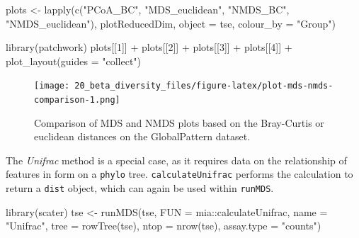 \documentclass[
]{book}
\newenvironment{Shaded}{\begin{snugshade}}{\end{snugshade}}
\newcommand{\AttributeTok}[1]{\textcolor[rgb]{0.77,0.63,0.00}{#1}}
\newcommand{\DecValTok}[1]{\textcolor[rgb]{0.00,0.00,0.81}{#1}}
\newcommand{\FunctionTok}[1]{\textcolor[rgb]{0.00,0.00,0.00}{#1}}
\newcommand{\NormalTok}[1]{#1}
\newcommand{\OtherTok}[1]{\textcolor[rgb]{0.56,0.35,0.01}{#1}}
\newcommand{\SpecialCharTok}[1]{\textcolor[rgb]{0.00,0.00,0.00}{#1}}
\newcommand{\StringTok}[1]{\textcolor[rgb]{0.31,0.60,0.02}{#1}}
\begin{document}
\begin{Shaded}
\begin{Highlighting}[]
\NormalTok{plots }\OtherTok{\textless{}{-}} \FunctionTok{lapply}\NormalTok{(}\FunctionTok{c}\NormalTok{(}\StringTok{"PCoA\_BC"}\NormalTok{, }\StringTok{"MDS\_euclidean"}\NormalTok{, }\StringTok{"NMDS\_BC"}\NormalTok{, }\StringTok{"NMDS\_euclidean"}\NormalTok{),}
\NormalTok{                plotReducedDim,}
                \AttributeTok{object =}\NormalTok{ tse,}
                \AttributeTok{colour\_by =} \StringTok{"Group"}\NormalTok{)}

\FunctionTok{library}\NormalTok{(patchwork)}
\NormalTok{plots[[}\DecValTok{1}\NormalTok{]] }\SpecialCharTok{+}\NormalTok{ plots[[}\DecValTok{2}\NormalTok{]] }\SpecialCharTok{+}\NormalTok{ plots[[}\DecValTok{3}\NormalTok{]] }\SpecialCharTok{+}\NormalTok{ plots[[}\DecValTok{4}\NormalTok{]] }\SpecialCharTok{+}
  \FunctionTok{plot\_layout}\NormalTok{(}\AttributeTok{guides =} \StringTok{"collect"}\NormalTok{)}
\end{Highlighting}
\end{Shaded}

\begin{figure}
\centering
\texttt{[image: 20\_beta\_diversity\_files/figure-latex/plot-mds-nmds-comparison-1.png]}
\caption{\label{fig:plot-mds-nmds-comparison}Comparison of MDS and NMDS plots based on the Bray-Curtis or euclidean distances on the GlobalPattern dataset.}
\end{figure}

The \emph{Unifrac} method is a special case, as it requires data on the
relationship of features in form on a \texttt{phylo} tree. \texttt{calculateUnifrac}
performs the calculation to return a \texttt{dist} object, which can again be
used within \texttt{runMDS}.

\begin{Shaded}
\begin{Highlighting}[]
\FunctionTok{library}\NormalTok{(scater)}
\NormalTok{tse }\OtherTok{\textless{}{-}} \FunctionTok{runMDS}\NormalTok{(tse, }\AttributeTok{FUN =}\NormalTok{ mia}\SpecialCharTok{::}\NormalTok{calculateUnifrac, }\AttributeTok{name =} \StringTok{"Unifrac"}\NormalTok{,}
              \AttributeTok{tree =} \FunctionTok{rowTree}\NormalTok{(tse),}
              \AttributeTok{ntop =} \FunctionTok{nrow}\NormalTok{(tse),}
             \AttributeTok{assay.type =} \StringTok{"counts"}\NormalTok{)}
\end{Highlighting}
\end{Shaded}
\end{document}
